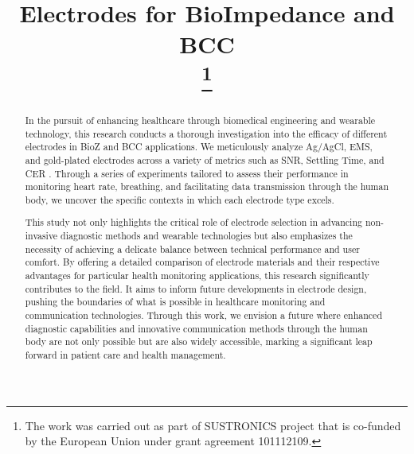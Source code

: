 \documentclass[conference]{IEEEtran}
\begin{document}

\title{Electrodes for BioImpedance and \gls{BCC}\\
\thanks{The work was carried out as part of SUSTRONICS
project that is co-funded by the European Union under grant
agreement 101112109.}
}

\author{
\and
{}
\and
{}
\and

\and
{}
\and
{}
}

\maketitle

\begin{abstract}
    In the pursuit of enhancing healthcare through biomedical engineering and wearable technology, this research conducts a thorough investigation into the efficacy of different electrodes in \gls{BioZ} and \gls{BCC} applications. We meticulously analyze Ag/AgCl, EMS, and gold-plated electrodes across a variety of metrics such as \gls{SNR}, Settling Time, and \gls{CER} . Through a series of experiments tailored to assess their performance in monitoring heart rate, breathing, and facilitating data transmission through the human body, we uncover the specific contexts in which each electrode type excels.

This study not only highlights the critical role of electrode selection in advancing non-invasive diagnostic methods and wearable technologies but also emphasizes the necessity of achieving a delicate balance between technical performance and user comfort. By offering a detailed comparison of electrode materials and their respective advantages for particular health monitoring applications, this research significantly contributes to the field. It aims to inform future developments in electrode design, pushing the boundaries of what is possible in healthcare monitoring and communication technologies. Through this work, we envision a future where enhanced diagnostic capabilities and innovative communication methods through the human body are not only possible but are also widely accessible, marking a significant leap forward in patient care and health management.
\end{abstract}
\end{document}
